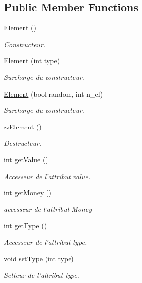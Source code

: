 \subsection*{Public Member Functions}
\begin{DoxyCompactItemize}
\item 
\hyperlink{classElement_ab0d0e20be9a36ae676202db753faeec9}{Element} ()
\begin{DoxyCompactList}\small\item\em Constructeur. \end{DoxyCompactList}\item 
\hyperlink{classElement_abd401e48661b56407c2d4c4da235f4ba}{Element} (int type)
\begin{DoxyCompactList}\small\item\em Surcharge du constructeur. \end{DoxyCompactList}\item 
\hyperlink{classElement_a4152d6fd18a1141be2592196c2c13d97}{Element} (bool random, int n\-\_\-el)
\begin{DoxyCompactList}\small\item\em Surcharge du constructeur. \end{DoxyCompactList}\item 
\hyperlink{classElement_a13d54ba9c08b6bec651402f1c2bb002c}{$\sim$\-Element} ()
\begin{DoxyCompactList}\small\item\em Destructeur. \end{DoxyCompactList}\item 
int \hyperlink{classElement_ae4b8bafd59a8e6bab7bb934679c200ac}{get\-Value} ()
\begin{DoxyCompactList}\small\item\em Accesseur de l'attribut value. \end{DoxyCompactList}\item 
int \hyperlink{classElement_a6414cb495f6b591c7ff9009682495c01}{get\-Money} ()
\begin{DoxyCompactList}\small\item\em accesseur de l'attribut Money \end{DoxyCompactList}\item 
int \hyperlink{classElement_a8bd9315dc4eb7b59f47410347375bf0e}{get\-Type} ()
\begin{DoxyCompactList}\small\item\em Accesseur de l'attribut type. \end{DoxyCompactList}\item 
void \hyperlink{classElement_a4629c727bd44fbae2a1a501edbc3a5f1}{set\-Type} (int type)
\begin{DoxyCompactList}\small\item\em Setteur de l'attribut type. \end{DoxyCompactList}\end{DoxyCompactItemize}
